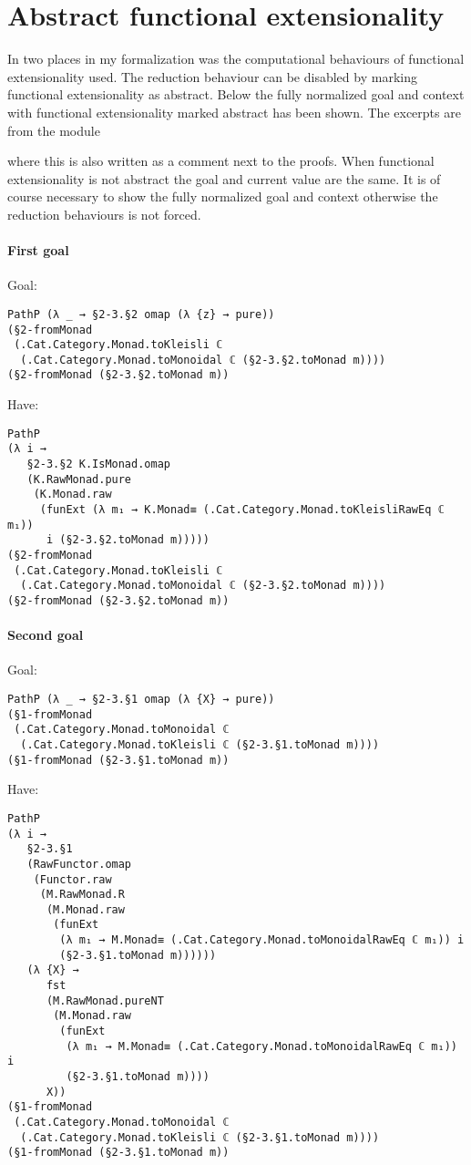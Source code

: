 \chapter{Abstract functional extensionality}
\label{app:abstract-funext}
In two places in my formalization was the computational behaviours of
functional extensionality used. The reduction behaviour can be
disabled by marking functional extensionality as abstract. Below the
fully normalized goal and context with functional extensionality
marked abstract has been shown. The excerpts are from the module
%
\begin{center}
\end{center}
%
where this is also written as a comment next to the proofs. When
functional extensionality is not abstract the goal and current value
are the same. It is of course necessary to show the fully normalized
goal and context otherwise the reduction behaviours is not forced.

\subsubsection*{First goal}
Goal:
\begin{verbatim}
PathP (λ _ → §2-3.§2 omap (λ {z} → pure))
(§2-fromMonad
 (.Cat.Category.Monad.toKleisli ℂ
  (.Cat.Category.Monad.toMonoidal ℂ (§2-3.§2.toMonad m))))
(§2-fromMonad (§2-3.§2.toMonad m))
\end{verbatim}
Have:
\begin{verbatim}
PathP
(λ i →
   §2-3.§2 K.IsMonad.omap
   (K.RawMonad.pure
    (K.Monad.raw
     (funExt (λ m₁ → K.Monad≡ (.Cat.Category.Monad.toKleisliRawEq ℂ m₁))
      i (§2-3.§2.toMonad m)))))
(§2-fromMonad
 (.Cat.Category.Monad.toKleisli ℂ
  (.Cat.Category.Monad.toMonoidal ℂ (§2-3.§2.toMonad m))))
(§2-fromMonad (§2-3.§2.toMonad m))
\end{verbatim}
\subsubsection*{Second goal}
Goal:
\begin{verbatim}
PathP (λ _ → §2-3.§1 omap (λ {X} → pure))
(§1-fromMonad
 (.Cat.Category.Monad.toMonoidal ℂ
  (.Cat.Category.Monad.toKleisli ℂ (§2-3.§1.toMonad m))))
(§1-fromMonad (§2-3.§1.toMonad m))
\end{verbatim}
Have:
\begin{verbatim}
PathP
(λ i →
   §2-3.§1
   (RawFunctor.omap
    (Functor.raw
     (M.RawMonad.R
      (M.Monad.raw
       (funExt
        (λ m₁ → M.Monad≡ (.Cat.Category.Monad.toMonoidalRawEq ℂ m₁)) i
        (§2-3.§1.toMonad m))))))
   (λ {X} →
      fst
      (M.RawMonad.pureNT
       (M.Monad.raw
        (funExt
         (λ m₁ → M.Monad≡ (.Cat.Category.Monad.toMonoidalRawEq ℂ m₁)) i
         (§2-3.§1.toMonad m))))
      X))
(§1-fromMonad
 (.Cat.Category.Monad.toMonoidal ℂ
  (.Cat.Category.Monad.toKleisli ℂ (§2-3.§1.toMonad m))))
(§1-fromMonad (§2-3.§1.toMonad m))
\end{verbatim}
